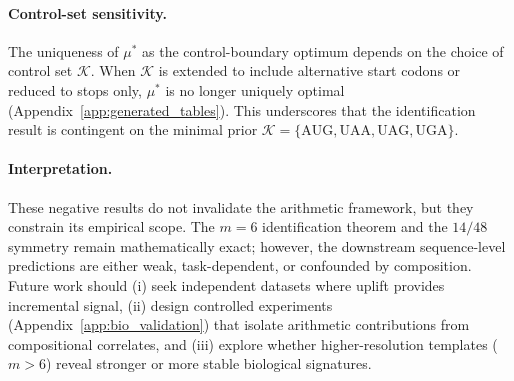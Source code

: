 \paragraph{Control-set sensitivity.}
The uniqueness of $\mu^\ast$ as the control-boundary optimum depends on the choice of control set $\mathcal{K}$.
When $\mathcal{K}$ is extended to include alternative start codons or reduced to stops only, $\mu^\ast$ is no longer uniquely optimal (Appendix~\ref{app:generated_tables}).
This underscores that the identification result is contingent on the minimal prior $\mathcal{K}=\{\mathrm{AUG,UAA,UAG,UGA}\}$.

\paragraph{Interpretation.}
These negative results do not invalidate the arithmetic framework, but they constrain its empirical scope.
The $m=6$ identification theorem and the $14/48$ symmetry remain mathematically exact; however, the downstream sequence-level predictions are either weak, task-dependent, or confounded by composition.
Future work should (i) seek independent datasets where uplift provides incremental signal, (ii) design controlled experiments (Appendix~\ref{app:bio_validation}) that isolate arithmetic contributions from compositional correlates, and (iii) explore whether higher-resolution templates ($m>6$) reveal stronger or more stable biological signatures.

